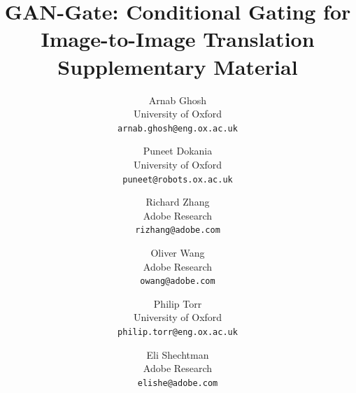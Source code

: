 \documentclass[10pt,twocolumn,letterpaper]{article}
\begin{document}
\title{GAN-Gate: Conditional Gating for Image-to-Image Translation \\ Supplementary Material}

\author{Arnab Ghosh\\
University of Oxford\\
{\tt\small arnab.ghosh@eng.ox.ac.uk}
\and
Puneet Dokania\\
University of Oxford\\
{\tt\small puneet@robots.ox.ac.uk}
\and
Richard Zhang\\
Adobe Research\\
{\tt\small rizhang@adobe.com}
\and
Oliver Wang\\
Adobe Research\\
{\tt\small owang@adobe.com}
\and
Philip Torr\\
University of Oxford\\
{\tt\small philip.torr@eng.ox.ac.uk}
\and
Eli Shechtman\\
Adobe Research\\
{\tt\small elishe@adobe.com}
}

\maketitle
\end{document}
